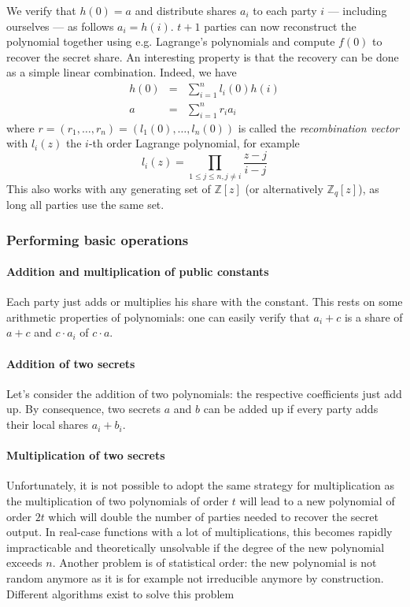We verify that $h(0)=a$ and distribute shares $a_i$ to each party $i$ --- including ourselves --- as follows $a_i=h(i)$. $t+1$ parties can now reconstruct the polynomial together using e.g. Lagrange's polynomials and compute $f(0)$ to recover the secret share. An interesting property is that the recovery can be done as a simple linear combination. Indeed, we have
\begin{eqnarray*}
    h(0) &=& \sum_{i=1}^{n} l_i(0)h(i) \\
    a &=& \sum_{i=1}^{n} r_ia_i
\end{eqnarray*}
where $r = \left(r_1, \ldots , r_n\right) = \left(l_1(0), \ldots , l_n(0)\right)$ is called the \emph{recombination vector} with $l_i(z)$ the $i$-th order Lagrange polynomial, for example
\begin{equation*}
    l_i(z) = \prod_{1\leq j \leq n,j\neq i}\frac{z-j}{i-j}
\end{equation*}
This also works with any generating set of $\mathbb{Z}\left[z\right]$ (or alternatively $\mathbb{Z}_q\left[z\right]$), as long all parties use the same set.

\subsubsection{Performing basic operations}

\paragraph{Addition and multiplication of public constants}
Each party just adds or multiplies his share with the constant. This rests on some arithmetic properties of polynomials: one can easily verify that $a_i+c$ is a share of $a+c$ and $c \cdot a_i$ of $c \cdot a$.

\paragraph{Addition of two secrets}
Let's consider the addition of two polynomials: the respective coefficients just add up. By consequence, two secrets $a$ and $b$ can be added up if every party adds their local shares $a_i+b_i$.


\paragraph{Multiplication of two secrets}
Unfortunately, it is not possible to adopt the same strategy for multiplication as the multiplication of two polynomials of order $t$ will lead to a new polynomial of order $2t$ which will double the number of parties needed to recover the secret output. In real-case functions with a lot of multiplications, this becomes rapidly impracticable and theoretically unsolvable if the degree of the new polynomial exceeds $n$. Another problem is of statistical order: the new polynomial is not random anymore as it is for example not irreducible anymore by construction. Different algorithms exist to solve this problem 


